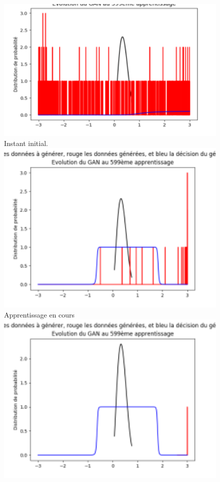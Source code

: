 \begin{figure}[t!]
\begin{center}
\includegraphics[width=1\textwidth]{images/Gan1D-1.png}
\centering\\Instant initial.
\endminipage\hfill
{}
\includegraphics[width=1\textwidth]{images/Gan1D-4.png}
\centering\\Apprentissage en cours
\endminipage\hfill
{}
\includegraphics[width=1\textwidth]{images/Gan1D-5.png}

\end{center}
\end{figure}
